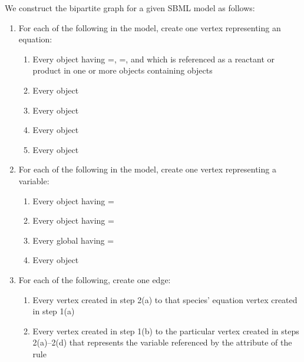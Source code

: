 We construct the bipartite graph for a given SBML model as follows:
\begin{enumerate}

\item For each of the following in the model, create one vertex
  representing an equation:
  \begin{enumerate}
    
  \item Every \Species object having
    =,
    =, and which is referenced as a
    reactant or product in one or more \Reaction objects
    containing \KineticLaw objects

  \item Every \AssignmentRule object

  \item Every \RateRule object

  \item Every \AlgebraicRule object

  \item Every \KineticLaw object

  \end{enumerate}
  
\item For each of the following in the model, create one vertex
  representing a variable:
  \begin{enumerate}

  \item Every \Species object having =
  \item Every \Compartment object having =
  \item Every global \Parameter having =
  \item Every \Reaction object

  \end{enumerate}
  
\item For each of the following, create one edge:
  \begin{enumerate}
    
  \item Every vertex created in step 2(a) to that species'
    equation vertex created in step 1(a)
    
  \item Every vertex created in step 1(b) to the particular vertex
    created in steps 2(a)--2(d) that represents the variable
    referenced by the  attribute of the rule
    

\end{enumerate}
\end{enumerate}
